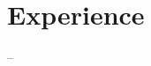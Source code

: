 \documentclass[10pt]{moderncv}
\begin{document}
\section{Experience}
\cventry
  --
  
  
  
  {}
  
\end{document}
